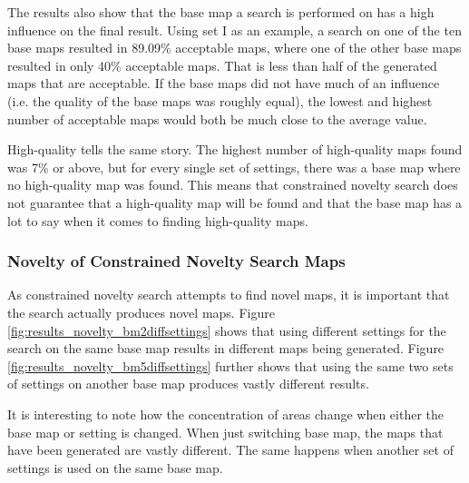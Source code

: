 The results also show that the base map a search is performed on has a high influence on the final result. Using set I as an example, a search on one of the ten base maps resulted in 89.09\% acceptable maps, where one of the other base maps resulted in only 40\% acceptable maps. That is less than half of the generated maps that are acceptable. If the base maps did not have much of an influence (i.e. the quality of the base maps was roughly equal), the lowest and highest number of acceptable maps would both be much close to the average value.

High-quality tells the same story. The highest number of high-quality maps found was 7\% or above, but for every single set of settings, there was a base map where no high-quality map was found. This means that constrained novelty search does not guarantee that a high-quality map will be found and that the base map has a lot to say when it comes to finding high-quality maps.

\subsubsection*{Novelty of Constrained Novelty Search Maps}

As constrained novelty search attempts to find novel maps, it is important that the search actually produces novel maps. Figure \ref{fig:results_novelty_bm2diffsettings} shows that using different settings for the search on the same base map results in different maps being generated. Figure \ref{fig:results_novelty_bm5diffsettings} further shows that using the same two sets of settings on another base map produces vastly different results. 

It is interesting to note how the concentration of areas change when either the base map or setting is changed. When just switching base map, the maps that have been generated are vastly different. The same happens when another set of settings is used on the same base map.


